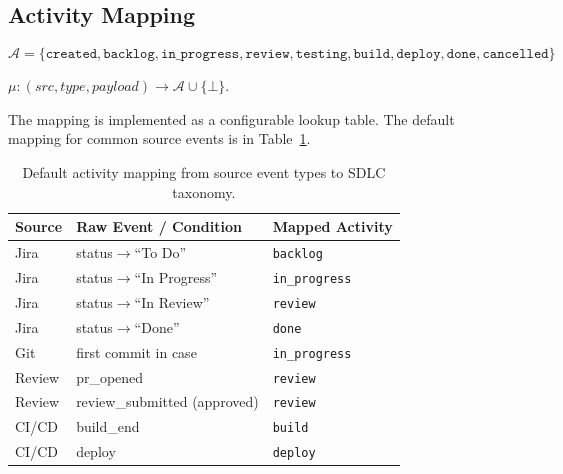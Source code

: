 \subsection{Activity Mapping}
\label{sec:s1-mapping}

\begin{definition}
\label{def:activity-taxonomy}
\begin{equation}
\label{eq:taxonomy}
\mathcal{A} = \{\texttt{created}, \texttt{backlog}, \texttt{in\_progress},
    \texttt{review}, \texttt{testing}, \texttt{build}, \texttt{deploy},
    \texttt{done}, \texttt{cancelled}\}
\end{equation}
\end{definition}

\begin{definition}
\label{def:activity-map}
$\mu : (src, type, payload) \to \mathcal{A} \cup \{\bot\}$.
\end{definition}

The mapping is implemented as a configurable lookup table. The default
mapping for common source events is in Table~\ref{tab:activity-mapping}.

\begin{table}[htbp]
\centering
\caption{Default activity mapping from source event types to SDLC taxonomy.}
\label{tab:activity-mapping}
\small
\begin{tabular}{lll}
\toprule
\textbf{Source} & \textbf{Raw Event / Condition} & \textbf{Mapped Activity} \\
\midrule
Jira   & status$\to$``To Do''         & \texttt{backlog} \\
Jira   & status$\to$``In Progress''   & \texttt{in\_progress} \\
Jira   & status$\to$``In Review''     & \texttt{review} \\
Jira   & status$\to$``Done''          & \texttt{done} \\
Git    & first commit in case          & \texttt{in\_progress} \\
Review & pr\_opened                    & \texttt{review} \\
Review & review\_submitted (approved)  & \texttt{review} \\
CI/CD  & build\_end                    & \texttt{build} \\
CI/CD  & deploy                        & \texttt{deploy} \\
\bottomrule
\end{tabular}
\end{table}


